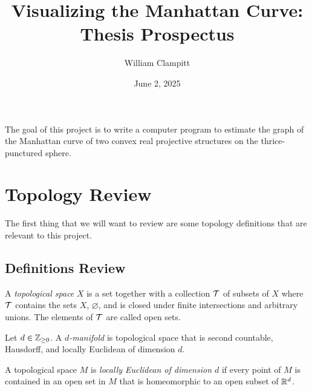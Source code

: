 \documentclass{amsart}
\title{Visualizing the Manhattan Curve:\\Thesis Prospectus}
\author{William Clampitt}
\date{June 2, 2025}
\begin{document}
	\maketitle
	The goal of this project is to write a computer program to estimate the graph of the Manhattan curve of two convex real projective structures on the thrice-punctured sphere.
	
	\section{Topology Review}
	
	The first thing that we will want to review are some topology definitions that are relevant to this project. 
	
	\subsection{Definitions Review}
	
	\begin{definition}
		A \emph{topological space} $X$ is a set together with a collection $\mathcal{T}$ of subsets of $X$ where $\mathcal{T}$ contains the sets $X$, $\varnothing$, and is closed under finite intersections and arbitrary unions. The elements of $\mathcal{T}$ are called open sets.
	\end{definition}
	
	\begin{definition}[$d$-manifold]
		Let $d\in \mathbb{Z}_{\geq 0}$. A \emph{$d$-manifold} is topological space that is second countable, Hausdorff, and locally Euclidean of dimension $d$.
	\end{definition}

	\begin{definition}
		A topological space $M$ is \emph{locally Euclidean of dimension $d$} if every point of $M$ is contained in an open set in $M$ that is homeomorphic to an open subset of $\mathbb{R}^d$.
	\end{definition}
	
\end{document}
